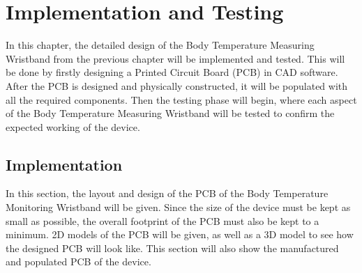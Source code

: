 \chapter{Implementation and Testing}\label{Ch5}
In this chapter, the detailed design of the Body Temperature Measuring Wristband from the previous chapter will be implemented and tested. This will be done by firstly designing a Printed Circuit Board (PCB) in CAD software. After the PCB is designed and physically constructed, it will be populated with all the required components. Then the testing phase will begin, where each aspect of the Body Temperature Measuring Wristband will be tested to confirm the expected working of the device.

\section{Implementation}
In this section, the layout and design of the PCB of the Body Temperature Monitoring Wristband will be given. Since the size of the device must be kept as small as possible, the overall footprint of the PCB must also be kept to a minimum. 2D models of the PCB will be given, as well as a 3D model to see how the designed PCB will look like. This section will also show the manufactured and populated PCB of the device. 

